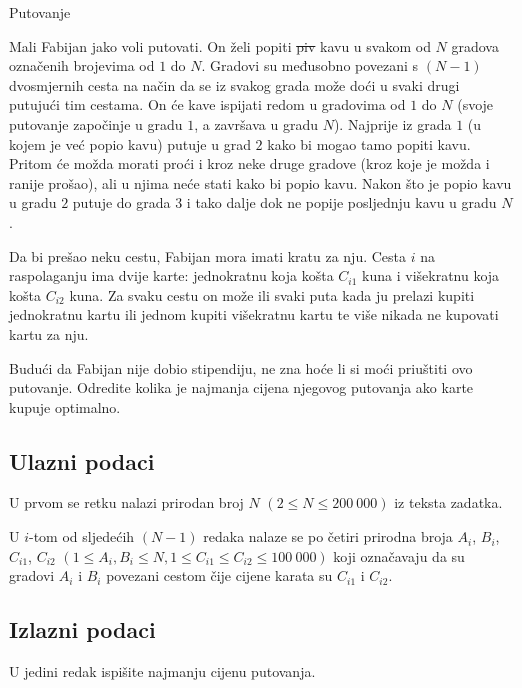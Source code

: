 \begin{statement}[
  problempoints=110,
  timelimit=1 sekunda,
  memorylimit=512 MiB,
]{Putovanje}

Mali Fabijan jako voli putovati. On želi popiti \sout{piv} kavu u svakom od $N$
gradova označenih brojevima od $1$ do $N$. Gradovi su međusobno povezani s $(N
- 1)$ dvosmjernih cesta na način da se iz svakog grada može doći u svaki drugi
putujući tim cestama. On će kave ispijati redom u gradovima od $1$ do $N$ (svoje
putovanje započinje u gradu $1$, a završava u gradu $N$). Najprije iz grada
$1$ (u kojem je već popio kavu) putuje u grad $2$ kako bi mogao tamo popiti
kavu. Pritom će možda morati proći i kroz neke druge gradove (kroz koje je
možda i ranije prošao), ali u njima neće stati kako bi popio kavu.  Nakon što
je popio kavu u gradu $2$ putuje do grada $3$ i tako dalje dok ne popije
posljednju kavu u gradu $N$.

Da bi prešao neku cestu, Fabijan mora imati kratu za nju. Cesta $i$ na
raspolaganju ima dvije karte: jednokratnu koja košta $C_{i1}$ kuna i
višekratnu koja košta $C_{i2}$ kuna. Za svaku cestu on može ili svaki puta
kada ju prelazi kupiti jednokratnu kartu ili jednom kupiti višekratnu kartu
te više nikada ne kupovati kartu za nju.

Budući da Fabijan nije dobio stipendiju, ne zna hoće li si moći priuštiti ovo
putovanje. Odredite kolika je najmanja cijena njegovog putovanja ako karte
kupuje optimalno.


\subsection*{Ulazni podaci}
U prvom se retku nalazi prirodan broj $N$ $(2 \le N \le 200\ 000)$ iz teksta
zadatka.

U $i$-tom od sljedećih $(N - 1)$ redaka nalaze se po četiri prirodna broja
$A_i$, $B_i$, $C_{i1}$, $C_{i2}$ $(1 \le A_i, B_i \le N, 1 \le C_{i1} \le
C_{i2} \le 100\ 000)$ koji označavaju da su gradovi $A_i$ i $B_i$ povezani
cestom čije cijene karata su   $C_{i1}$ i $C_{i2}$.

\subsection*{Izlazni podaci}
U jedini redak ispišite najmanju cijenu putovanja.


\end{statement}
